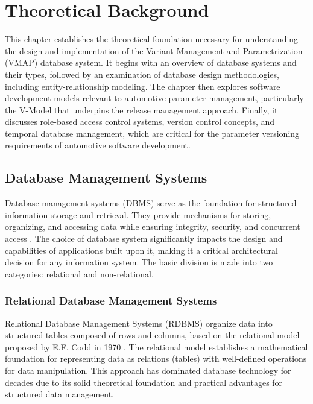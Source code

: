 \chapter{Theoretical Background}
\label{chap:theoretical-background}

This chapter establishes the theoretical foundation necessary for understanding the design and implementation of the Variant Management and Parametrization (VMAP) database system. It begins with an overview of database systems and their types, followed by an examination of database design methodologies, including entity-relationship modeling. The chapter then explores software development models relevant to automotive parameter management, particularly the V-Model that underpins the release management approach. Finally, it discusses role-based access control systems, version control concepts, and temporal database management, which are critical for the parameter versioning requirements of automotive software development.

\section{Database Management Systems}
\label{sec:database-management-systems}

Database management systems (DBMS) serve as the foundation for structured information storage and retrieval. They provide mechanisms for storing, organizing, and accessing data while ensuring integrity, security, and concurrent access \cite{elmasri2015fundamentals}. The choice of database system significantly impacts the design and capabilities of applications built upon it, making it a critical architectural decision for any information system. The basic division is made into two categories: relational and non-relational.

\subsection{Relational Database Management Systems}
\label{subsec:relational-database-management-systems}

Relational Database Management Systems (RDBMS) organize data into structured tables composed of rows and columns, based on the relational model proposed by E.F. Codd in 1970 \cite{codd1970relational}. The relational model establishes a mathematical foundation for representing data as relations (tables) with well-defined operations for data manipulation. This approach has dominated database technology for decades due to its solid theoretical foundation and practical advantages for structured data management.

